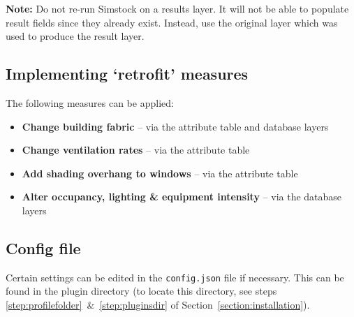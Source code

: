 \documentclass{article}
\begin{document}
\textbf{Note:} Do not re-run Simstock on a results layer. It will not be able to populate result fields since they already exist. Instead, use the original layer which was used to produce the result layer.


\subsection{Implementing `retrofit' measures}
The following measures can be applied:
\begin{itemize}
    \item \textbf{Change building fabric} -- via the attribute table and database layers
    \item \textbf{Change ventilation rates} -- via the attribute table
    \item \textbf{Add shading overhang to windows} -- via the attribute table
    \item \textbf{Alter occupancy, lighting \& equipment intensity} -- via the database layers
\end{itemize}


\subsection{Config file}
\label{section:config}
Certain settings can be edited in the \texttt{config.json} file if necessary. This can be found in the plugin directory (to locate this directory, see steps \ref{step:profilefolder}~\&~\ref{step:pluginsdir} of Section~\ref{section:installation}). \\
\end{document}
